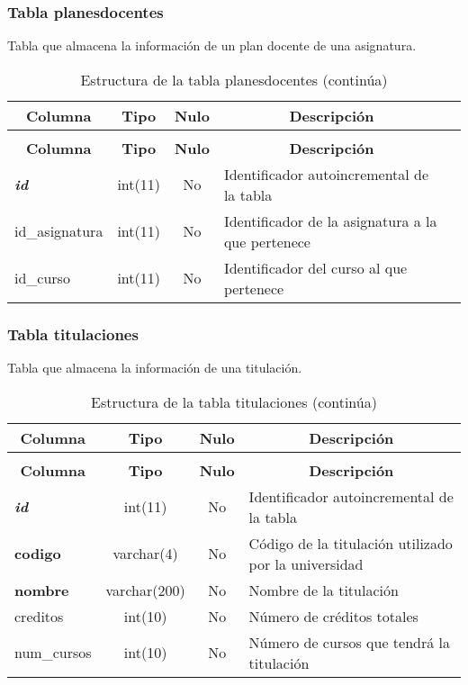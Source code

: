 \subsubsection{Tabla planesdocentes}
Tabla que almacena la información de un plan docente de una asignatura.
%
%
 \begin{longtable}{|l|c|c|l|l|} 
 \caption{Estructura de la tabla planesdocentes} \label{tab:planesdocentes-structure} \\
 \hline \multicolumn{1}{|c|}{\textbf{Columna}} & \multicolumn{1}{|c|}{\textbf{Tipo}} & \multicolumn{1}{|c|}{\textbf{Nulo}} & \multicolumn{1}{|c|}{\textbf{Descripción}}\\ \hline \hline
\endfirsthead
 \caption{Estructura de la tabla planesdocentes (continúa)} \\ 
 \hline \multicolumn{1}{|c|}{\textbf{Columna}} & \multicolumn{1}{|c|}{\textbf{Tipo}} & \multicolumn{1}{|c|}{\textbf{Nulo}} & \multicolumn{1}{|c|}{\textbf{Descripción}}\\ \hline \hline \endhead \endfoot 
\textbf{\textit{id}} & int(11) & No & Identificador autoincremental de la tabla \\ \hline 
id\_asignatura & int(11) & No & Identificador de la asignatura a la que pertenece \\ \hline 
id\_curso & int(11) & No & Identificador del curso al que pertenece \\ \hline 
 \end{longtable}

\subsubsection{Tabla titulaciones}
Tabla que almacena la información de una titulación.
%
%
 \begin{longtable}{|l|c|c|l|} 
 \caption{Estructura de la tabla titulaciones} \label{tab:titulaciones-structure} \\
 \hline \multicolumn{1}{|c|}{\textbf{Columna}} & \multicolumn{1}{|c|}{\textbf{Tipo}} & \multicolumn{1}{|c|}{\textbf{Nulo}} & \multicolumn{1}{|c|}{\textbf{Descripción}} \\ \hline \hline
\endfirsthead
 \caption{Estructura de la tabla titulaciones (continúa)} \\ 
 \hline \multicolumn{1}{|c|}{\textbf{Columna}} & \multicolumn{1}{|c|}{\textbf{Tipo}} & \multicolumn{1}{|c|}{\textbf{Nulo}} & \multicolumn{1}{|c|}{\textbf{Descripción}} \\ \hline \hline \endhead \endfoot 
\textbf{\textit{id}} & int(11) & No & Identificador autoincremental de la tabla \\ \hline 
\textbf{codigo} & varchar(4) & No & Código de la titulación utilizado por la universidad \\ \hline 
\textbf{nombre} & varchar(200) & No & Nombre de la titulación \\ \hline 
creditos & int(10)  & No & Número de créditos totales \\ \hline 
num\_cursos & int(10)  & No & Número de cursos que tendrá la titulación \\ \hline 
 \end{longtable}

